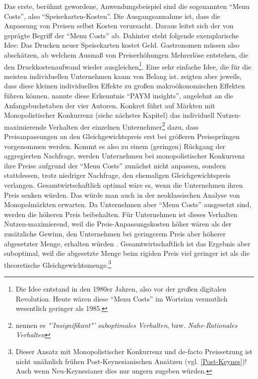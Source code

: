 Das erste, berühmt gewordene, Anwendungsbeispiel sind die sogenannten "`Menu Costs"', also "`Speisekarten-Kosten"'. Die Ausgangsannahme ist, dass die Anpassung von Preisen selbst Kosten verursacht. Daraus leitet sich der von \textcite{Mankiw1985b} geprägte Begriff der "`Menu Costs"' ab. Dahinter steht folgende exemplarische Idee: Das Drucken neuer Speisekarten kostet Geld. Gastronomen müssen also abschätzen, ab welchem Ausmaß von Preiserhöhungen Mehrerlöse entstehen, die den Druckkostenaufwand wieder ausgleichen\footnote{Die Idee entstand in den 1980er Jahren, also vor der großen digitalen Revolution. Heute wären diese "`Menu Costs"' im Wortsinn vermutlich wesentlich geringer als 1985.}. Eine sehr einfache Idee, die für die meisten individuellen Unternehmen kaum von Belang ist. \textcite{Akerlof1985, Mankiw1985b, Parkin1986} zeigten aber jeweils, dass diese kleinen individuellen Effekte zu großen makroökonomischen Effekten führen können. \textcite{Rotemberg1987} nannte diese Erkenntnis "`PAYM insights"', angelehnt an die Anfangsbuchstaben der vier Autoren. Konkret führt auf Märkten mit Monopolistischer Konkurrenz (siehe nächstes Kapitel) das individuell Nutzen-maximierende Verhalten der einzelnen Unternehmer\footnote{\textcite[S. 823]{Akerlof1985} nennen es \textit{"'Insignifikant"' suboptimales Verhalten}, bzw. \textit{Nahe-Rationales Verhalten}} dazu, dass Preisanpassungen an den Gleichgewichtspreis erst bei größeren Preissprüngen vorgenommen werden.  Kommt es also zu einem (geringen) Rückgang der aggregierten Nachfrage, werden Unternehmen bei monopolistischer Konkurrenz ihre Preise aufgrund der "`Menu Costs"' zunächst nicht anpassen, sondern stattdessen, trotz niedriger Nachfrage, den ehemaligen Gleichgewichtspreis verlangen. Gesamtwirtschaftlich optimal wäre es, wenn die Unternehmen ihren Preis senken würden. Das würde man auch in der neoklassischen Analyse von Monopolmärkten erwarten. Da Unternehmen aber "`Menu Costs"' ausgesetzt sind, werden die höheren Preis beibehalten. Für Unternehmen ist dieses Verhalten Nutzen-maximierend, weil die Preis-Anpassungskosten höher wären als der zusätzliche Gewinn, den Unternehmen bei geringerem Preis aber höherer abgesetzter Menge, erhalten würden \parencite[S. 372]{Snowdon2005}. Gesamtwirtschaftlich ist das Ergebnis aber suboptimal, weil die abgesetzte Menge beim rigiden Preis viel geringer ist als die theoretische Gleichgewichtsmenge.\footnote{Dieser Ansatz mit Monopolistischer Konkurrenz und de-facto Preissetzung ist nicht unähnlich frühen Post-Keynesianischen Ansätzen (vgl. \ref{Post-Keynes})! Auch wenn Neu-Keynesianer dies nur ungern zugeben würden.} 

